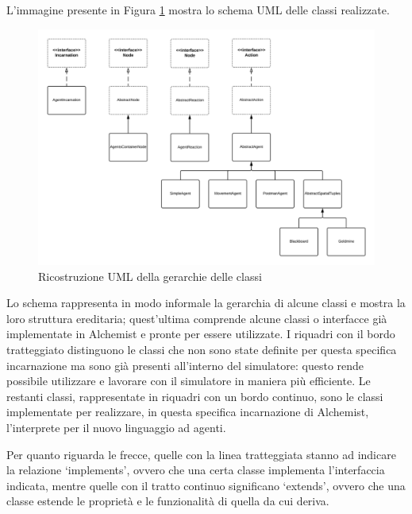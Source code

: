 L'immagine presente in Figura \ref{fig:UMLGerarchiaClassi} mostra lo schema UML delle classi realizzate.
\begin{figure} %
\hspace*{-1cm}
\includegraphics[width=18cm]{images/UML_agenti.png} %
\caption[Ricostruzione UML della gerarchia delle classi]{Ricostruzione UML della gerarchie delle classi} \label{fig:UMLGerarchiaClassi}
\end{figure}

Lo schema rappresenta in modo informale la gerarchia di alcune classi e mostra la loro struttura ereditaria; quest'ultima comprende alcune classi o interfacce già implementate in Alchemist e pronte per essere utilizzate. I riquadri con il bordo tratteggiato distinguono le classi che non sono state definite per questa specifica incarnazione ma sono già presenti all'interno del simulatore: questo rende possibile utilizzare e lavorare con il simulatore in maniera più efficiente. Le restanti classi, rappresentate in riquadri con un bordo continuo, sono le classi implementate per realizzare, in questa specifica incarnazione di Alchemist, l'interprete per il nuovo linguaggio ad agenti.

Per quanto riguarda le frecce, quelle con la linea tratteggiata stanno ad indicare la relazione `implements', ovvero che una certa classe implementa l'interfaccia indicata, mentre quelle con il tratto continuo significano `extends', ovvero che una classe estende le proprietà e le funzionalità di quella da cui deriva.

